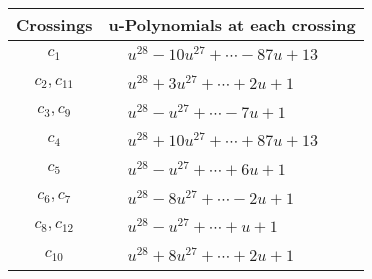 \documentclass[1p]{elsarticle_modified}
\theoremstyle{definition}
\begin{document}
\begin{tabular}{m{50pt}|m{274pt}}
Crossings & \hspace{64pt}u-Polynomials at each crossing \\
\hline $$\begin{aligned}c_{1}\end{aligned}$$&$\begin{aligned}
&u^{28}-10 u^{27}+\cdots-87 u+13
\end{aligned}$\\
\hline $$\begin{aligned}c_{2},c_{11}\end{aligned}$$&$\begin{aligned}
&u^{28}+3 u^{27}+\cdots+2 u+1
\end{aligned}$\\
\hline $$\begin{aligned}c_{3},c_{9}\end{aligned}$$&$\begin{aligned}
&u^{28}- u^{27}+\cdots-7 u+1
\end{aligned}$\\
\hline $$\begin{aligned}c_{4}\end{aligned}$$&$\begin{aligned}
&u^{28}+10 u^{27}+\cdots+87 u+13
\end{aligned}$\\
\hline $$\begin{aligned}c_{5}\end{aligned}$$&$\begin{aligned}
&u^{28}- u^{27}+\cdots+6 u+1
\end{aligned}$\\
\hline $$\begin{aligned}c_{6},c_{7}\end{aligned}$$&$\begin{aligned}
&u^{28}-8 u^{27}+\cdots-2 u+1
\end{aligned}$\\
\hline $$\begin{aligned}c_{8},c_{12}\end{aligned}$$&$\begin{aligned}
&u^{28}- u^{27}+\cdots+u+1
\end{aligned}$\\
\hline $$\begin{aligned}c_{10}\end{aligned}$$&$\begin{aligned}
&u^{28}+8 u^{27}+\cdots+2 u+1
\end{aligned}$\\
\hline
\end{tabular}\\~\\
\end{document}
